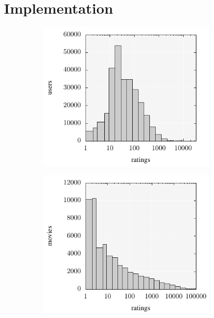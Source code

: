 \documentclass[crop=false,10pt]{standalone}
\begin{document}
  \section{Implementation} %
  \label{sec:Implementation}
    \begin{figure}
      \center
      \begin{subfigure}[b]{0.49\textwidth}
        \center
        \includegraphics[width=0.99\textwidth]{figures/movielens-user-histogram.pdf}
      \end{subfigure}
      \hfill
      \begin{subfigure}[b]{0.49\textwidth}
        \center
        \includegraphics[width=0.99\textwidth]{figures/movielens-movie-histogram.pdf}

\end{subfigure}
\end{figure}
\end{document}
